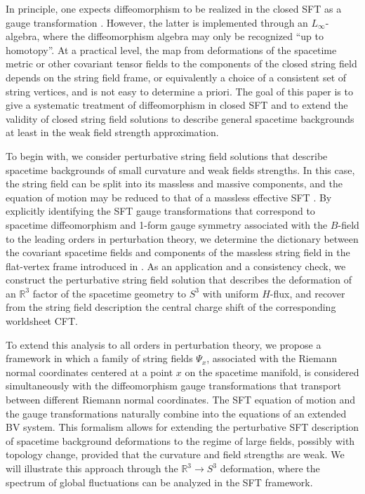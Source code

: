 \documentclass[12pt]{article}
\begin{document}
In principle, one expects diffeomorphism to be realized in the closed SFT as a gauge transformation \cite{Ghoshal:1991pu}. However, the latter is implemented through an $L_\infty$-algebra, where the diffeomorphism algebra may only be recognized ``up to homotopy''. At a practical level, the map from deformations of the spacetime metric or other covariant tensor fields to the components of the closed string field depends on the string field frame, or equivalently a choice of a consistent set of string vertices, and is not easy to determine a priori. The goal of this paper is to give a systematic treatment of diffeomorphism in closed SFT and to extend the validity of closed string field solutions to describe general spacetime backgrounds at least in the weak field strength approximation.

To begin with, we consider perturbative string field solutions that describe spacetime backgrounds of small curvature and weak fields strengths. In this case, the string field can be split into its massless and massive components, and the equation of motion may be reduced to that of a massless effective SFT \cite{Sen:2016qap, Erbin:2020eyc}. By explicitly identifying the SFT gauge transformations that correspond to spacetime diffeomorphism and 1-form gauge symmetry associated with the $B$-field to the leading orders in perturbation theory, we determine the dictionary between the covariant spacetime fields and components of the massless string field in the flat-vertex frame introduced in \cite{Mazel:2024alu}. As an application and a consistency check, we construct the perturbative string field solution that describes the deformation of an $\mathbb{R}^3$ factor of the spacetime geometry to $S^3$ with uniform $H$-flux, and recover from the string field description the central charge shift of the corresponding worldsheet CFT.

To extend this analysis to all orders in perturbation theory, we propose a framework in which a family of string fields $\Psi_x$, associated with the Riemann normal coordinates centered at a point $x$ on the spacetime manifold, is considered simultaneously with the diffeomorphism gauge transformations that transport between different Riemann normal coordinates. The SFT equation of motion and the gauge transformations naturally combine into the equations of an extended BV system. This formalism allows for extending the perturbative SFT description of spacetime background deformations to the regime of large fields, possibly with topology change, provided that the curvature and field strengths are weak. We will illustrate this approach through the $\mathbb{R}^3\to S^3$ deformation, where the spectrum of global fluctuations can be analyzed in the SFT framework.
\end{document}
